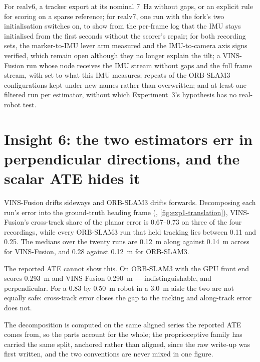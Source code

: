 \documentclass[11pt,a4paper,notitlepage]{report}
\newcommand{\patdir}{../../../../output/compare/simulation/exp1-error-pattern}
\newcommand{\pat}[1]{}
\begin{document}
\begin{queried}
For realv6, a tracker export at its nominal \SI{7}{\hertz} without gaps, or an
explicit rule for scoring on a sparse reference; for realv7, one run with the
fork's two initialisation switches on, to show from the per-frame log that the
IMU stays initialised from the first seconds without the scorer's repair; for
both recording sets, the marker-to-IMU lever arm measured and the IMU-to-camera axis
signs verified, which remain open although they no longer explain the tilt; a
VINS-Fusion run whose node receives the IMU stream without gaps and the full
frame stream, with  set to what this IMU measures; repeats of the
ORB-SLAM3 configurations kept under new names rather than overwritten; and at
least one filtered run per estimator, without which Experiment~3's hypothesis
has no real-robot test.
\end{queried}

\FloatBarrier
\section{Insight 6: the two estimators err in perpendicular directions, and the
scalar ATE hides it}

VINS-Fusion drifts sideways and ORB-SLAM3 drifts forwards. Decomposing each
run's error into the ground-truth heading frame
(\pat{translation.tex}, \cref{fig:exp1-translation}), VINS-Fusion's cross-track
share of the planar error is \numrange{0.67}{0.73} on three of the four
recordings, while every ORB-SLAM3 run that held tracking lies between
\num{0.11} and \num{0.25}. The medians over the twenty runs are
\SI{0.12}{\metre} along against \SI{0.14}{\metre} across for VINS-Fusion, and
\SI{0.28}{} against \SI{0.12}{\metre} for ORB-SLAM3.

The reported ATE cannot show this. On  ORB-SLAM3 with the
GPU front end scores \SI{0.293}{\metre} and VINS-Fusion \SI{0.290}{\metre} ---
indistinguishable, and perpendicular. For a \num{0.83} by \SI{0.50}{\metre}
robot in a \SI{3.0}{\metre} aisle the two are not equally safe: cross-track
error closes the gap to the racking and along-track error does not.

The decomposition is computed on the same aligned series the reported ATE comes
from, so the parts account for the whole; the proprioceptive family has carried
the same split, anchored rather than aligned, since the raw write-up was
first written, and the two conventions are never mixed in one figure.
\end{document}
